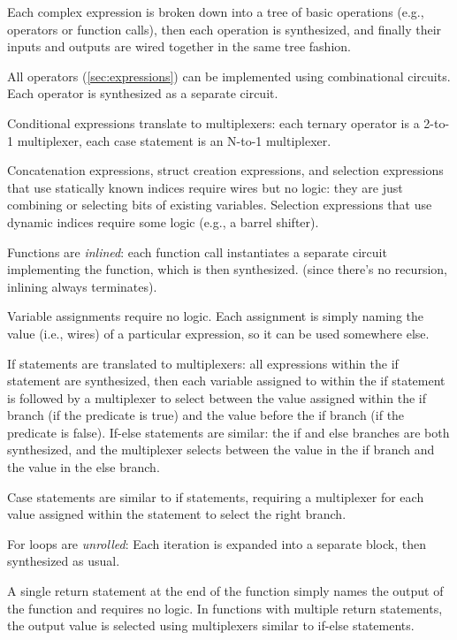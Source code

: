 \begin{compactitem}
\item Each complex expression is broken down into a tree of basic operations (e.g., operators or function calls), then each operation is synthesized,
  and finally their inputs and outputs are wired together in the same tree fashion.
\item All operators (\autoref{sec:expressions}) can be implemented using combinational circuits.
  Each operator is synthesized as a separate circuit.
\item Conditional expressions translate to multiplexers: each ternary operator is a 2-to-1 multiplexer, each case statement is an N-to-1 multiplexer.
\item Concatenation expressions, struct creation expressions, and selection expressions that use statically known indices require wires but no logic:
  they are just combining or selecting bits of existing variables.
  Selection expressions that use dynamic indices require some logic (e.g., a barrel shifter).
\item Functions are \emph{inlined}: each function call instantiates a separate circuit implementing the function, which is then synthesized.
  (since there's no recursion, inlining always terminates).
\item Variable assignments require no logic. Each assignment is simply naming the value (i.e., wires) of a particular expression,
  so it can be used somewhere else.
\item If statements are translated to multiplexers: all expressions within the if statement are synthesized,
  then each variable assigned to within the if statement is followed by a multiplexer
  to select between the value assigned within the if branch (if the predicate is true)
  and the value before the if branch (if the predicate is false).
  If-else statements are similar: the if and else branches are both synthesized,
  and the multiplexer selects between the value in the if branch and the value in the else branch.
\item Case statements are similar to if statements, requiring a multiplexer for each value assigned
  within the statement to select the right branch.
\item For loops are \emph{unrolled}: Each iteration is expanded into a separate block, then synthesized as usual.
\item A single return statement at the end of the function simply names the output of the function and requires no logic.
  In functions with multiple return statements, the output value is selected using multiplexers similar to if-else statements.
\end{compactitem}



